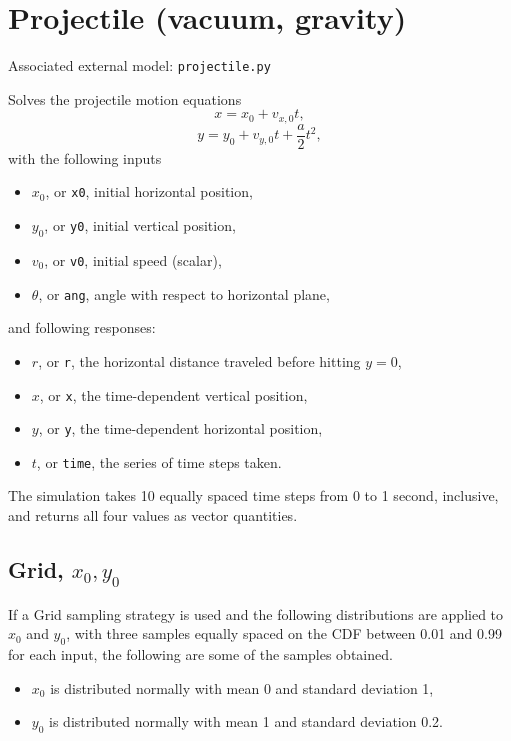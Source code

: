 \section{Projectile (vacuum, gravity)}
Associated external model: \texttt{projectile.py}

Solves the projectile motion equations
\begin{equation}
  x = x_0 + v_{x,0} t,
\end{equation}
\begin{equation}
  y = y_0 + v_{y,0} t + \frac{a}{2} t^2,
\end{equation}
with the following inputs
\begin{itemize}
  \item $x_0$, or \texttt{x0}, initial horizontal position,
  \item $y_0$, or \texttt{y0}, initial vertical position,
  \item $v_0$, or \texttt{v0}, initial speed (scalar),
  \item $\theta$, or \texttt{ang}, angle with respect to horizontal plane,
\end{itemize}
and following responses:
\begin{itemize}
  \item $r$, or \texttt{r}, the horizontal distance traveled before hitting $y=0$,
  \item $x$, or \texttt{x}, the time-dependent vertical position,
  \item $y$, or \texttt{y}, the time-dependent horizontal position,
  \item $t$, or \texttt{time}, the series of time steps taken.
\end{itemize}
The simulation takes 10 equally spaced time steps from 0 to 1 second, inclusive, and returns all four values
as vector quantities.

\subsection{Grid, $x_0,y_0$}
If a Grid sampling strategy is used and the following distributions are applied to $x_0$ and $y_0$, with three
samples equally spaced on the CDF between 0.01 and 0.99 for each input, the following are some of the samples obtained.
\begin{itemize}
  \item $x_0$ is distributed normally with mean 0 and standard deviation 1,
  \item $y_0$ is distributed normally with mean 1 and standard deviation 0.2.
\end{itemize}

